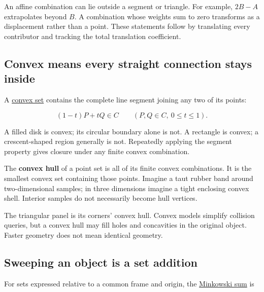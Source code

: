 An affine combination can lie outside a segment or triangle. For example, \(2B-A\) extrapolates beyond \(B\). A combination whose weights sum to zero transforms as a displacement rather than a point. These statements follow by translating every contributor and tracking the total translation coefficient.

\subsection{Convex means every straight connection stays inside}\label{01-foundations-i-ch018-convex-means-every-straight-connection-stays-inside}

\hypertarget{01-foundations-i-ch018-convex-means-every-straight-connection-stays-inside}{}

A \hyperref[01-foundations-i-ch018-weighted-points-lead-from-affine-geometry-to-collision-shapes]{convex set} contains the complete line segment joining any two of its points:

\[
(1-t)P+tQ\in C\qquad(P,Q\in C,\ 0\le t\le1).
\]

A filled disk is convex; its circular boundary alone is not. A rectangle is convex; a crescent-shaped region generally is not. Repeatedly applying the segment property gives closure under any finite convex combination.

The \textbf{convex hull} of a point set is all of its finite convex combinations. It is the smallest convex set containing those points. Imagine a taut rubber band around two-dimensional samples; in three dimensions imagine a tight enclosing convex shell. Interior samples do not necessarily become hull vertices.

The triangular panel is its corners' convex hull. Convex models simplify collision queries, but a convex hull may fill holes and concavities in the original object. Faster geometry does not mean identical geometry.

\subsection{Sweeping an object is a set addition}\label{01-foundations-i-ch018-sweeping-an-object-is-a-set-addition}

\hypertarget{01-foundations-i-ch018-sweeping-an-object-is-a-set-addition}{}

For sets expressed relative to a common frame and origin, the \hyperref[01-foundations-i-ch018-weighted-points-lead-from-affine-geometry-to-collision-shapes]{Minkowski sum} is

